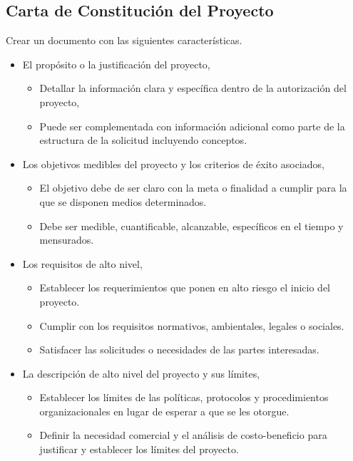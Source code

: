 \documentclass[letterpaper,12pt,openright,oneside]{article}
\theoremstyle{plain}
\begin{document}
\subsection*{Carta de Constitución del Proyecto}

Crear un documento con las siguientes características.

\begin{itemize}
    \item El propósito o la justificación del proyecto, 
        \begin{itemize}
            \item Detallar la información clara y específica dentro de la autorización del proyecto, 
            \item Puede ser complementada con información adicional como parte de la estructura de la solicitud incluyendo conceptos.
        \end{itemize}
    \item Los objetivos medibles del proyecto y los criterios de éxito asociados,
        \begin{itemize}
            \item El objetivo debe de ser claro con la meta o finalidad a cumplir para la que se disponen medios determinados.
            \item Debe ser medible, cuantificable, alcanzable, específicos en el tiempo y mensurados.
        \end{itemize}
    \item Los requisitos de alto nivel,
        \begin{itemize}
            \item Establecer los requerimientos que ponen en alto riesgo el inicio del proyecto.
            \item Cumplir con los requisitos normativos, ambientales, legales o sociales.
            \item Satisfacer las solicitudes o necesidades de las partes interesadas.
        \end{itemize}
    \item La descripción de alto nivel del proyecto y sus límites,
        \begin{itemize}
            \item Establecer los límites de las políticas, protocolos y procedimientos organizacionales en lugar de esperar a que se les otorgue.
            \item Definir la necesidad comercial y el análisis de costo-beneficio para justificar y establecer los límites del proyecto.

\end{itemize}
\end{itemize}
\end{document}
